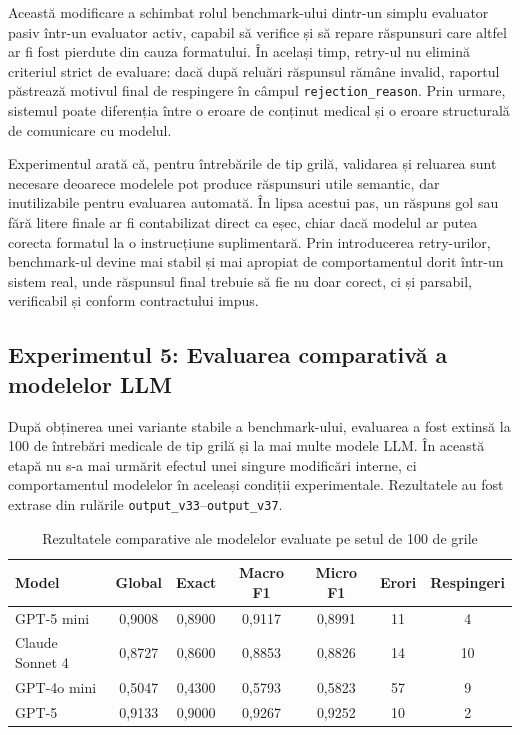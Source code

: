 \documentclass[12pt, a4paper, oneside, romanian]{teza-upb}
\begin{document}
Această modificare a schimbat rolul benchmark-ului dintr-un simplu evaluator pasiv într-un evaluator activ, capabil să verifice și să repare răspunsuri care altfel ar fi fost pierdute din cauza formatului. În același timp, retry-ul nu elimină criteriul strict de evaluare: dacă după reluări răspunsul rămâne invalid, raportul păstrează motivul final de respingere în câmpul \texttt{rejection\_reason}. Prin urmare, sistemul poate diferenția între o eroare de conținut medical și o eroare structurală de comunicare cu modelul.

Experimentul arată că, pentru întrebările de tip grilă, validarea și reluarea sunt necesare deoarece modelele pot produce răspunsuri utile semantic, dar inutilizabile pentru evaluarea automată. În lipsa acestui pas, un răspuns gol sau fără litere finale ar fi contabilizat direct ca eșec, chiar dacă modelul ar putea corecta formatul la o instrucțiune suplimentară. Prin introducerea retry-urilor, benchmark-ul devine mai stabil și mai apropiat de comportamentul dorit într-un sistem real, unde răspunsul final trebuie să fie nu doar corect, ci și parsabil, verificabil și conform contractului impus.

\subsection{Experimentul 5: Evaluarea comparativă a modelelor LLM}

După obținerea unei variante stabile a benchmark-ului, evaluarea a fost extinsă la 100 de întrebări medicale de tip grilă și la mai multe modele LLM. În această etapă nu s-a mai urmărit efectul unei singure modificări interne, ci comportamentul modelelor în aceleași condiții experimentale. Rezultatele au fost extrase din rulările \texttt{output\_v33}--\texttt{output\_v37}.

\begin{table}[H]
\centering
\label{tab:rezultate_benchmark_llm}
\small
\setlength{\tabcolsep}{4pt}
\begin{tabular}{lcccccc}
\toprule
\textbf{Model} & \textbf{Global} & \textbf{Exact} & \textbf{Macro F1} & \textbf{Micro F1} & \textbf{Erori} & \textbf{Respingeri} \\
\midrule
GPT-5 mini & 0,9008 & 0,8900 & 0,9117 & 0,8991 & 11 & 4 \\
Claude Sonnet 4 & 0,8727 & 0,8600 & 0,8853 & 0,8826 & 14 & 10 \\
GPT-4o mini & 0,5047 & 0,4300 & 0,5793 & 0,5823 & 57 & 9 \\
GPT-5 & 0,9133 & 0,9000 & 0,9267 & 0,9252 & 10 & 2 \\
\bottomrule
\end{tabular}
\caption{Rezultatele comparative ale modelelor evaluate pe setul de 100 de grile}
\end{table}
\end{document}

